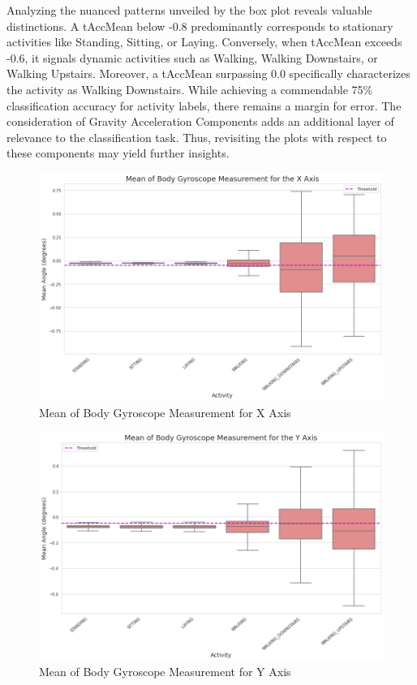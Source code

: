 \documentclass[11pt]{article}
\begin{document}
Analyzing the nuanced patterns unveiled by the box plot reveals valuable distinctions. A tAccMean below -0.8 predominantly corresponds to stationary activities like Standing, Sitting, or Laying. Conversely, when tAccMean exceeds -0.6, it signals dynamic activities such as Walking, Walking Downstairs, or Walking Upstairs. Moreover, a tAccMean surpassing 0.0 specifically characterizes the activity as Walking Downstairs. While achieving a commendable 75\% classification accuracy for activity labels, there remains a margin for error. The consideration of Gravity Acceleration Components adds an additional layer of relevance to the classification task. Thus, revisiting the plots with respect to these components may yield further insights.

\begin{figure}[h!]
	\includegraphics[width= 1.0 \linewidth]{mean_body_gyroscope_x.png}
	\centering
	\caption{Mean of Body Gyroscope Measurement for X Axis}
	\label{mean_body_gyroscope_x.png}
\end{figure}

\begin{figure}[h!]
	\includegraphics[width= 1.0 \linewidth]{mean_body_gyroscope_y.png}
	\centering
	\caption{Mean of Body Gyroscope Measurement for Y Axis}
	\label{mean_body_gyroscope_y.png}
\end{figure}
\end{document}
